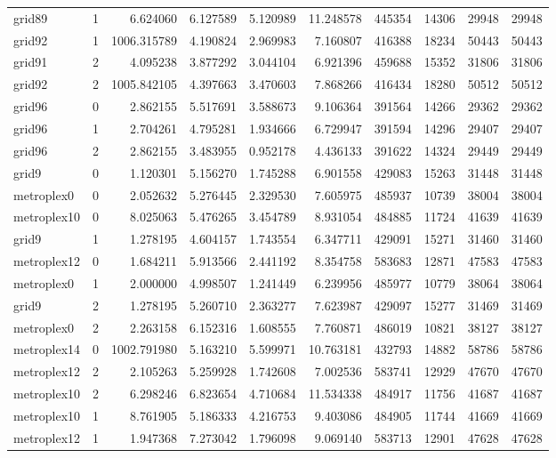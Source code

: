 \begin{longtable}{|l|r|r|r|r|r|r|r|r|r|}
grid89 & 1 & 6.624060 & 6.127589 & 5.120989 & 11.248578 & 445354 & 14306 & 29948 & 29948 \\
grid92 & 1 & 1006.315789 & 4.190824 & 2.969983 & 7.160807 & 416388 & 18234 & 50443 & 50443 \\
grid91 & 2 & 4.095238 & 3.877292 & 3.044104 & 6.921396 & 459688 & 15352 & 31806 & 31806 \\
grid92 & 2 & 1005.842105 & 4.397663 & 3.470603 & 7.868266 & 416434 & 18280 & 50512 & 50512 \\
grid96 & 0 & 2.862155 & 5.517691 & 3.588673 & 9.106364 & 391564 & 14266 & 29362 & 29362 \\
grid96 & 1 & 2.704261 & 4.795281 & 1.934666 & 6.729947 & 391594 & 14296 & 29407 & 29407 \\
grid96 & 2 & 2.862155 & 3.483955 & 0.952178 & 4.436133 & 391622 & 14324 & 29449 & 29449 \\
grid9 & 0 & 1.120301 & 5.156270 & 1.745288 & 6.901558 & 429083 & 15263 & 31448 & 31448 \\
metroplex0 & 0 & 2.052632 & 5.276445 & 2.329530 & 7.605975 & 485937 & 10739 & 38004 & 38004 \\
metroplex10 & 0 & 8.025063 & 5.476265 & 3.454789 & 8.931054 & 484885 & 11724 & 41639 & 41639 \\
grid9 & 1 & 1.278195 & 4.604157 & 1.743554 & 6.347711 & 429091 & 15271 & 31460 & 31460 \\
metroplex12 & 0 & 1.684211 & 5.913566 & 2.441192 & 8.354758 & 583683 & 12871 & 47583 & 47583 \\
metroplex0 & 1 & 2.000000 & 4.998507 & 1.241449 & 6.239956 & 485977 & 10779 & 38064 & 38064 \\
grid9 & 2 & 1.278195 & 5.260710 & 2.363277 & 7.623987 & 429097 & 15277 & 31469 & 31469 \\
metroplex0 & 2 & 2.263158 & 6.152316 & 1.608555 & 7.760871 & 486019 & 10821 & 38127 & 38127 \\
metroplex14 & 0 & 1002.791980 & 5.163210 & 5.599971 & 10.763181 & 432793 & 14882 & 58786 & 58786 \\
metroplex12 & 2 & 2.105263 & 5.259928 & 1.742608 & 7.002536 & 583741 & 12929 & 47670 & 47670 \\
metroplex10 & 2 & 6.298246 & 6.823654 & 4.710684 & 11.534338 & 484917 & 11756 & 41687 & 41687 \\
metroplex10 & 1 & 8.761905 & 5.186333 & 4.216753 & 9.403086 & 484905 & 11744 & 41669 & 41669 \\
metroplex12 & 1 & 1.947368 & 7.273042 & 1.796098 & 9.069140 & 583713 & 12901 & 47628 & 47628 \\

\end{longtable}
